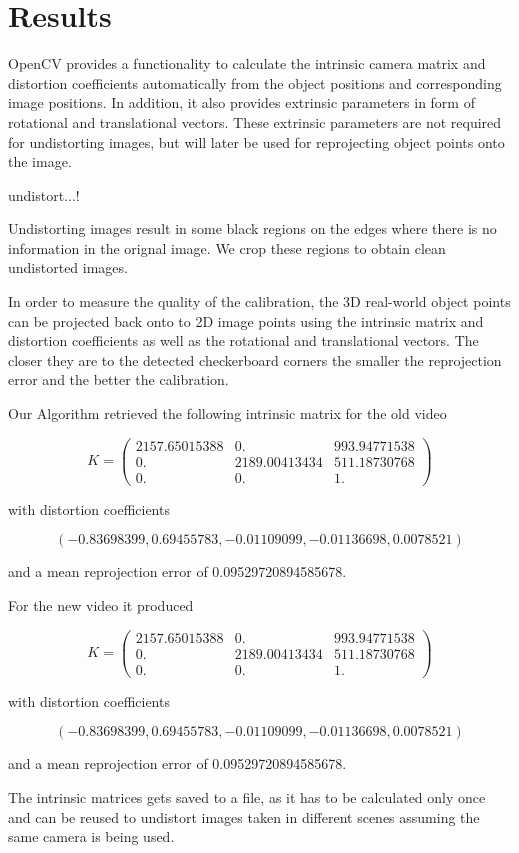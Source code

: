 \documentclass[bibliography=totoc]{scrartcl}
\begin{document}
\section{Results}
OpenCV provides a functionality to calculate the intrinsic camera matrix and distortion coefficients automatically from the object positions and corresponding image positions.
In addition, it also provides extrinsic parameters in form of rotational and translational vectors.
These extrinsic parameters are not required for undistorting images, but will later be used for reprojecting object points onto the image.

undistort...!

Undistorting images result in some black regions on the edges where there is no information in the orignal image.
We crop these regions to obtain clean undistorted images.

In order to measure the quality of the calibration, the 3D real-world object points can be projected back onto to 2D image points using the intrinsic matrix and distortion coefficients as well as the rotational and translational vectors.
The closer they are to the detected checkerboard corners the smaller the reprojection error and the better the calibration.

Our Algorithm retrieved the following intrinsic matrix for the old video

$$
K =
\begin{pmatrix}
    2157.65015388 & 0. & 993.94771538 \\
    0. & 2189.00413434 & 511.18730768 \\
    0. & 0. & 1.
\end{pmatrix}
$$

with distortion coefficients

$$(-0.83698399, 0.69455783, -0.01109099, -0.01136698, 0.0078521)$$

and a mean reprojection error of 0.09529720894585678.

For the new video it produced 

$$
K =
\begin{pmatrix}
    2157.65015388 & 0. & 993.94771538 \\
    0. & 2189.00413434 & 511.18730768 \\
    0. & 0. & 1.
\end{pmatrix}
$$

with distortion coefficients

$$(-0.83698399, 0.69455783, -0.01109099, -0.01136698, 0.0078521)$$

and a mean reprojection error of 0.09529720894585678.

The intrinsic matrices gets saved to a file, as it has to be calculated only once and can be reused to undistort images taken in different scenes assuming the same camera is being used.

\clearpage


\end{document}
